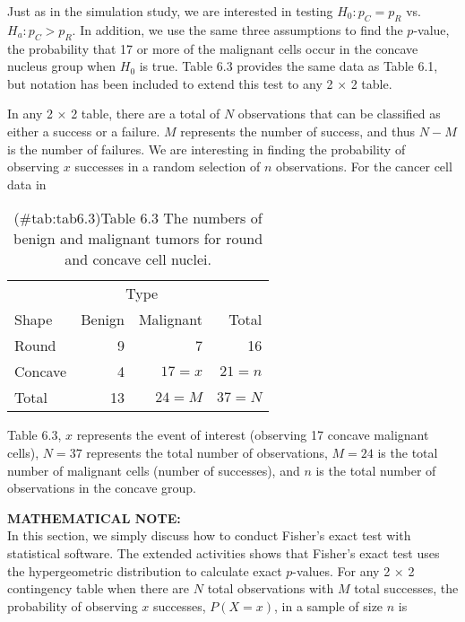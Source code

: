 \documentclass[
]{report}
\begin{document}
Just as in the simulation study, we are interested in testing \(H_0: p_C = p_R\) vs.~\(H_a: p_C > p_R\). In addition, we use the same three assumptions to find the \(p\)-value, the probability that 17 or more of the malignant cells occur in the concave nucleus group when \(H_0\) is true. Table 6.3 provides the same data as Table 6.1, but notation has been included to extend this test to any 2 × 2 table.

In any 2 × 2 table, there are a total of \(N\) observations that can be classified as either a success or a failure. \(M\) represents the number of success, and thus \(N - M\) is the number of failures. We are interesting in finding the probability of observing \(x\) successes in a random selection of \(n\) observations. For the cancer cell data in

\begin{table}[H]
\centering
\caption{(\#tab:tab6.3)Table 6.3 The numbers of benign and malignant tumors for round and concave cell nuclei.}
\centering
\begin{tabular}[t]{lrrr}
\toprule
\multicolumn{1}{c}{ } & \multicolumn{2}{c}{Type} & \multicolumn{1}{c}{ } \\
\cmidrule(l{3pt}r{3pt}){2-3}
Shape & Benign & Malignant & Total\\
\midrule
Round & 9 & 7 & 16\\
Concave & 4 & $17 = x$ & $21 = n$\\
Total & 13 & $24 = M$ & $37 = N$\\
\bottomrule
\end{tabular}
\end{table}

Table 6.3, \(x\) represents the event of interest (observing 17 concave malignant cells), \(N = 37\) represents the total number of observations, \(M = 24\) is the total number of malignant cells (number of successes), and \(n\) is the total number of observations in the concave group.

\large

\textbf{MATHEMATICAL NOTE:}\\
In this section, we simply discuss how to conduct Fisher's exact test with statistical software. The extended activities shows that Fisher's exact test uses the hypergeometric distribution to calculate exact \(p\)-values. For any 2 × 2 contingency table when there are \(N\) total observations with \(M\) total successes, the probability of observing \(x\) successes, \(P(X = x)\), in a sample of size \(n\) is
\normalsize
\end{document}

